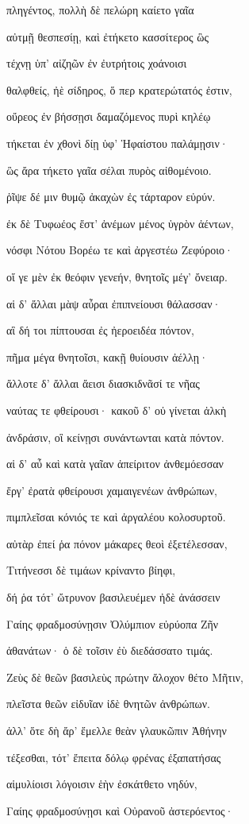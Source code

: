 \begin{pages}
\begin{Leftside}
πληγέντος, πολλὴ δὲ πελώρη καίετο γαῖα 

αὐτμῇ θεσπεσίῃ, καὶ ἐτήκετο κασσίτερος ὣς

τέχνῃ ὑπ' αἰζηῶν ἐν ἐυτρήτοις χοάνοισι

θαλφθείς, ἠὲ σίδηρος, ὅ περ κρατερώτατός ἐστιν, 

οὔρεος ἐν βήσσῃσι δαμαζόμενος πυρὶ κηλέῳ 

τήκεται ἐν χθονὶ δίῃ ὑφ' Ἡφαίστου παλάμῃσιν· 

ὣς ἄρα τήκετο γαῖα σέλαι πυρὸς αἰθομένοιο.

ῥῖψε δέ μιν θυμῷ ἀκαχὼν ἐς τάρταρον εὐρύν. 

ἐκ δὲ Τυφωέος ἔστ' ἀνέμων μένος ὑγρὸν ἀέντων,

νόσφι Νότου Βορέω τε καὶ ἀργεστέω Ζεφύροιο· 

οἵ γε μὲν ἐκ θεόφιν γενεήν, θνητοῖς μέγ' ὄνειαρ.

αἱ δ' ἄλλαι μὰψ αὖραι ἐπιπνείουσι θάλασσαν·

αἳ δή τοι πίπτουσαι ἐς ἠεροειδέα πόντον,

πῆμα μέγα θνητοῖσι, κακῇ θυίουσιν ἀέλλῃ· 

ἄλλοτε δ' ἄλλαι ἄεισι διασκιδνᾶσί τε νῆας 

ναύτας τε φθείρουσι· κακοῦ δ' οὐ γίνεται ἀλκὴ 

ἀνδράσιν, οἳ κείνῃσι συνάντωνται κατὰ πόντον. 

αἱ δ' αὖ καὶ κατὰ γαῖαν ἀπείριτον ἀνθεμόεσσαν

ἔργ' ἐρατὰ φθείρουσι χαμαιγενέων ἀνθρώπων, 

πιμπλεῖσαι κόνιός τε καὶ ἀργαλέου κολοσυρτοῦ. 

αὐτὰρ ἐπεί ῥα πόνον μάκαρες θεοὶ ἐξετέλεσσαν, 

Τιτήνεσσι δὲ τιμάων κρίναντο βίηφι,

δή ῥα τότ' ὤτρυνον βασιλευέμεν ἠδὲ ἀνάσσειν

Γαίης φραδμοσύνῃσιν Ὀλύμπιον εὐρύοπα Ζῆν

ἀθανάτων· ὁ δὲ τοῖσιν ἐὺ διεδάσσατο τιμάς. 

Ζεὺς δὲ θεῶν βασιλεὺς πρώτην ἄλοχον θέτο Μῆτιν, 

πλεῖστα θεῶν εἰδυῖαν ἰδὲ θνητῶν ἀνθρώπων. 

ἀλλ' ὅτε δὴ ἄρ' ἔμελλε θεὰν γλαυκῶπιν Ἀθήνην

τέξεσθαι, τότ' ἔπειτα δόλῳ φρένας ἐξαπατήσας

αἱμυλίοισι λόγοισιν ἑὴν ἐσκάτθετο νηδύν,  

Γαίης φραδμοσύνῃσι καὶ Οὐρανοῦ ἀστερόεντος· 


\end{Leftside}
\end{pages}
